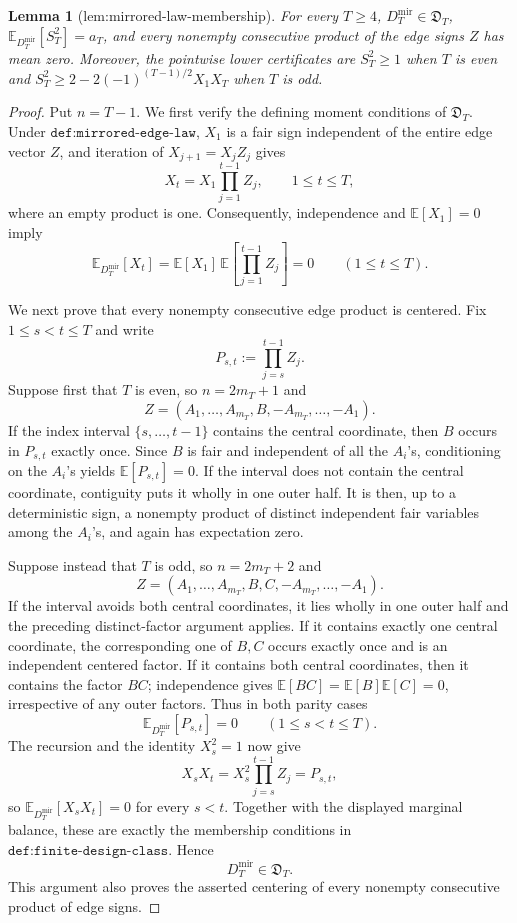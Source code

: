 \documentclass{article}
\newtheorem{lemma}{Lemma}
\begin{document}
\begin{lemma}[lem:mirrored-law-membership]\label{lem:mirrored-law-membership}
For every \(T\ge4\), \(D_T^{\mathrm{mir}}\in\mathfrak D_T\), \(\mathbb E_{D_T^{\mathrm{mir}}}[S_T^2]=a_T\), and every nonempty consecutive product of the edge signs \(Z\) has mean zero. Moreover, the pointwise lower certificates are \(S_T^2\ge1\) when \(T\) is even and \(S_T^2\ge2-2(-1)^{(T-1)/2}X_1X_T\) when \(T\) is odd.
\end{lemma}
\begin{proof}
Put \(n=T-1\).  We first verify the defining moment conditions of \(\mathfrak D_T\).  Under \(\texttt{def:mirrored-edge-law}\), \(X_1\) is a fair sign independent of the entire edge vector \(Z\), and iteration of \(X_{j+1}=X_jZ_j\) gives
\[
 X_t=X_1\prod_{j=1}^{t-1}Z_j,
 \qquad 1\le t\le T,
\]
where an empty product is one.  Consequently, independence and \(\mathbb E[X_1]=0\) imply
\[
 \mathbb E_{D_T^{\mathrm{mir}}}[X_t]
 =\mathbb E[X_1]\,\mathbb E\!\left[\prod_{j=1}^{t-1}Z_j\right]=0
 \qquad(1\le t\le T).
\]

We next prove that every nonempty consecutive edge product is centered.  Fix \(1\le s<t\le T\) and write
\[
 P_{s,t}:=\prod_{j=s}^{t-1}Z_j.
\]
Suppose first that \(T\) is even, so \(n=2m_T+1\) and
\[
 Z=(A_1,\ldots,A_{m_T},B,-A_{m_T},\ldots,-A_1).
\]
If the index interval \(\{s,\ldots,t-1\}\) contains the central coordinate, then \(B\) occurs in \(P_{s,t}\) exactly once.  Since \(B\) is fair and independent of all the \(A_i\)'s, conditioning on the \(A_i\)'s yields \(\mathbb E[P_{s,t}]=0\).  If the interval does not contain the central coordinate, contiguity puts it wholly in one outer half.  It is then, up to a deterministic sign, a nonempty product of distinct independent fair variables among the \(A_i\)'s, and again has expectation zero.

Suppose instead that \(T\) is odd, so \(n=2m_T+2\) and
\[
 Z=(A_1,\ldots,A_{m_T},B,C,-A_{m_T},\ldots,-A_1).
\]
If the interval avoids both central coordinates, it lies wholly in one outer half and the preceding distinct-factor argument applies.  If it contains exactly one central coordinate, the corresponding one of \(B,C\) occurs exactly once and is an independent centered factor.  If it contains both central coordinates, then it contains the factor \(BC\); independence gives \(\mathbb E[BC]=\mathbb E[B]\mathbb E[C]=0\), irrespective of any outer factors.  Thus in both parity cases
\[
 \mathbb E_{D_T^{\mathrm{mir}}}[P_{s,t}]=0
 \qquad(1\le s<t\le T).
\]
The recursion and the identity \(X_s^2=1\) now give
\[
 X_sX_t
 =X_s^2\prod_{j=s}^{t-1}Z_j
 =P_{s,t},
\]
so \(\mathbb E_{D_T^{\mathrm{mir}}}[X_sX_t]=0\) for every \(s<t\).  Together with the displayed marginal balance, these are exactly the membership conditions in \(\texttt{def:finite-design-class}\).  Hence
\[
 D_T^{\mathrm{mir}}\in\mathfrak D_T.
\]
This argument also proves the asserted centering of every nonempty consecutive product of edge signs.


\end{proof}
\end{document}
